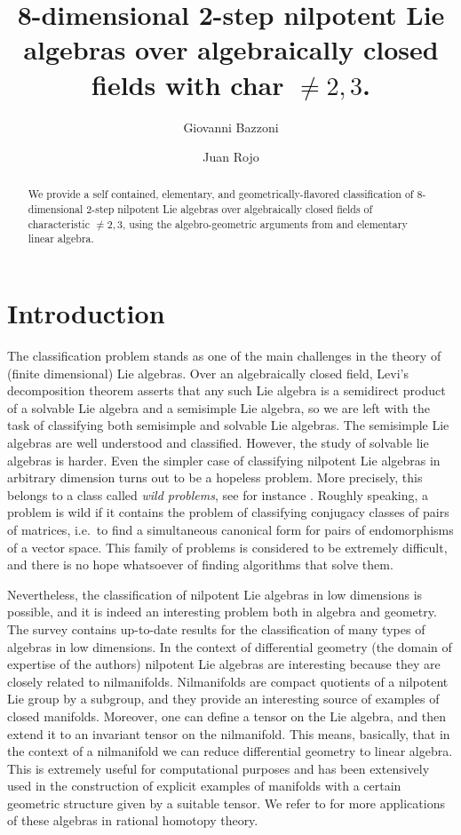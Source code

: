\documentclass[10pt,reqno]{amsart}
\title{8-dimensional 2-step nilpotent Lie algebras over algebraically closed fields with char $\ne 2,3$.}
\author[G. Bazzoni]{Giovanni Bazzoni}
\author[J. Rojo]{Juan Rojo}
\theoremstyle{definition}
\begin{document}
\begin{abstract}
We provide a self contained, elementary, and geometrically-flavored classification of $8$-dimensional $2$-step nilpotent Lie algebras over algebraically closed fields of characteristic $\ne 2,3$, using the algebro-geometric arguments from \cite{B} and elementary linear algebra.
\end{abstract}

\maketitle



\section{Introduction}

The classification problem stands as one of the main challenges in the theory of (finite dimensional) Lie algebras. 
Over an algebraically closed field, Levi's decomposition theorem asserts that any such Lie algebra is a semidirect product of a solvable Lie algebra and a semisimple Lie algebra, so we are left with the task of classifying both semisimple and solvable Lie algebras. The semisimple Lie algebras are well understood and classified. 
However, the study of solvable lie algebras is harder. Even the simpler case of classifying nilpotent Lie algebras in arbitrary dimension turns out to be a hopeless problem. More precisely, this belongs to a class called \emph{wild problems}, see for instance \cite{Belitskii}. Roughly speaking, a problem is wild if it contains the problem of classifying conjugacy classes of pairs of matrices, i.e.~to find a simultaneous canonical form for pairs of endomorphisms of a vector space. This family of problems is considered to be extremely difficult, and there is no hope whatsoever of finding algorithms that solve them.

Nevertheless, the classification of nilpotent Lie algebras in low dimensions is possible, and it is indeed an interesting problem both in algebra and geometry. The survey \cite{Kaygorodov_2024} contains up-to-date results for the classification of many types of algebras in low dimensions. In the context of differential geometry (the domain of expertise of the authors) nilpotent Lie algebras are interesting because they are closely related to nilmanifolds. Nilmanifolds are compact quotients of a nilpotent Lie group by a subgroup, and they provide an interesting source of examples of closed manifolds. Moreover, one can define a tensor on the Lie algebra, and then extend it to an invariant tensor on the nilmanifold. This means, basically, that in the context of a nilmanifold we can reduce differential geometry to linear algebra. This is extremely useful for computational purposes and has been extensively used in the construction of explicit examples of manifolds with a certain geometric structure given by a suitable tensor. We refer to \cite{Tralle-Oprea} for more applications of these algebras in rational homotopy theory.
\end{document}
